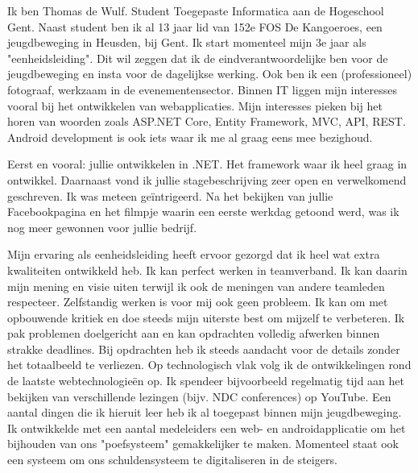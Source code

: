 \documentclass[11pt, a4paper]{awesome-cv} %
\begin{document}
\makecvheader %

\makelettertitle %


\begin{cvletter}




Ik ben Thomas de Wulf. Student Toegepaste Informatica aan de Hogeschool Gent. Naast student ben ik al 13 jaar lid van 152e FOS De Kangoeroes, een jeugdbeweging in Heusden, bij Gent. Ik start momenteel mijn 3e jaar als "eenheidsleiding". Dit wil zeggen dat ik de eindverantwoordelijke ben voor de jeugdbeweging en insta voor de dagelijkse werking.
Ook ben ik een (professioneel) fotograaf, werkzaam in de evenementensector. 
\newline Binnen IT liggen mijn interesses vooral bij het ontwikkelen van webapplicaties. Mijn interesses pieken bij het horen van woorden zoals ASP.NET Core, Entity Framework, MVC, API, REST. Android development is ook iets waar ik me al graag eens mee bezighoud. 


Eerst en vooral: jullie ontwikkelen in .NET. Het framework waar ik heel graag in ontwikkel. \newline Daarnaast vond ik jullie stage\-beschrijving zeer open en verwelkomend geschreven. Ik was meteen geïntrigeerd. Na het bekijken van jullie Facebookpagina en het filmpje waarin een eerste werkdag getoond werd, was ik nog meer gewonnen voor jullie bedrijf. 


Mijn ervaring als eenheidsleiding heeft ervoor gezorgd dat ik heel wat extra kwaliteiten ontwikkeld heb. Ik kan perfect werken in teamverband. Ik kan daarin mijn mening en visie uiten terwijl ik ook de meningen van andere teamleden respecteer. Zelfstandig werken is voor mij ook geen probleem. Ik kan om met opbouwende kritiek en doe steeds mijn uiterste best om mijzelf te verbeteren. Ik pak problemen doelgericht aan en kan opdrachten volledig afwerken binnen strakke deadlines. Bij opdrachten heb ik steeds aandacht voor de details zonder het totaalbeeld te verliezen.
Op technologisch vlak volg ik de ontwikkelingen rond de laatste webtechnologieën op. Ik spendeer bijvoorbeeld regelmatig tijd aan het bekijken van verschillende lezingen (bijv. NDC conferences) op YouTube. Een aantal dingen die ik hieruit leer heb ik al toegepast binnen mijn jeugdbeweging. Ik ontwikkelde met een aantal medeleiders een web- en androidapplicatie om het bijhouden van ons "poefsysteem" gemakkelijker te maken. Momenteel staat ook een systeem om ons schuldensysteem te digitaliseren in de steigers.


\end{cvletter}
\end{document}
